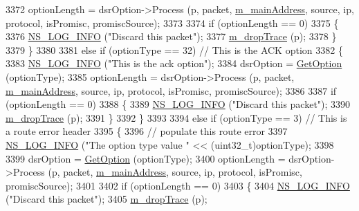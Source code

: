 \begin{DoxyCode}
3372       optionLength = dsrOption->Process (p, packet, \hyperlink{classns3_1_1dsr_1_1DsrRouting_a73182b5edee2d8460f28855e058fc9a0}{m\_mainAddress}, source, ip, protocol, 
      isPromisc, promiscSource);
3373 
3374       \textcolor{keywordflow}{if} (optionLength == 0)
3375         \{
3376           \hyperlink{group__logging_gafbd73ee2cf9f26b319f49086d8e860fb}{NS\_LOG\_INFO} (\textcolor{stringliteral}{"Discard this packet"});
3377           \hyperlink{classns3_1_1dsr_1_1DsrRouting_aacee2c8437c0b61579cfa7a420423e03}{m\_dropTrace} (p);
3378         \}
3379     \}
3380 
3381   \textcolor{keywordflow}{else} \textcolor{keywordflow}{if} (optionType == 32)       \textcolor{comment}{// This is the ACK option}
3382     \{
3383       \hyperlink{group__logging_gafbd73ee2cf9f26b319f49086d8e860fb}{NS\_LOG\_INFO} (\textcolor{stringliteral}{"This is the ack option"});
3384       dsrOption = \hyperlink{classns3_1_1dsr_1_1DsrRouting_a5cdb4c336831a3158c6ba12d226a198e}{GetOption} (optionType);
3385       optionLength = dsrOption->Process (p, packet, \hyperlink{classns3_1_1dsr_1_1DsrRouting_a73182b5edee2d8460f28855e058fc9a0}{m\_mainAddress}, source, ip, protocol, 
      isPromisc, promiscSource);
3386 
3387       \textcolor{keywordflow}{if} (optionLength == 0)
3388         \{
3389           \hyperlink{group__logging_gafbd73ee2cf9f26b319f49086d8e860fb}{NS\_LOG\_INFO} (\textcolor{stringliteral}{"Discard this packet"});
3390           \hyperlink{classns3_1_1dsr_1_1DsrRouting_aacee2c8437c0b61579cfa7a420423e03}{m\_dropTrace} (p);
3391         \}
3392     \}
3393 
3394   \textcolor{keywordflow}{else} \textcolor{keywordflow}{if} (optionType == 3)       \textcolor{comment}{// This is a route error header}
3395     \{
3396       \textcolor{comment}{// populate this route error}
3397       \hyperlink{group__logging_gafbd73ee2cf9f26b319f49086d8e860fb}{NS\_LOG\_INFO} (\textcolor{stringliteral}{"The option type value "} << (uint32\_t)optionType);
3398 
3399       dsrOption = \hyperlink{classns3_1_1dsr_1_1DsrRouting_a5cdb4c336831a3158c6ba12d226a198e}{GetOption} (optionType);
3400       optionLength = dsrOption->Process (p, packet, \hyperlink{classns3_1_1dsr_1_1DsrRouting_a73182b5edee2d8460f28855e058fc9a0}{m\_mainAddress}, source, ip, protocol, 
      isPromisc, promiscSource);
3401 
3402       \textcolor{keywordflow}{if} (optionLength == 0)
3403         \{
3404           \hyperlink{group__logging_gafbd73ee2cf9f26b319f49086d8e860fb}{NS\_LOG\_INFO} (\textcolor{stringliteral}{"Discard this packet"});
3405           \hyperlink{classns3_1_1dsr_1_1DsrRouting_aacee2c8437c0b61579cfa7a420423e03}{m\_dropTrace} (p);

\end{DoxyCode}
